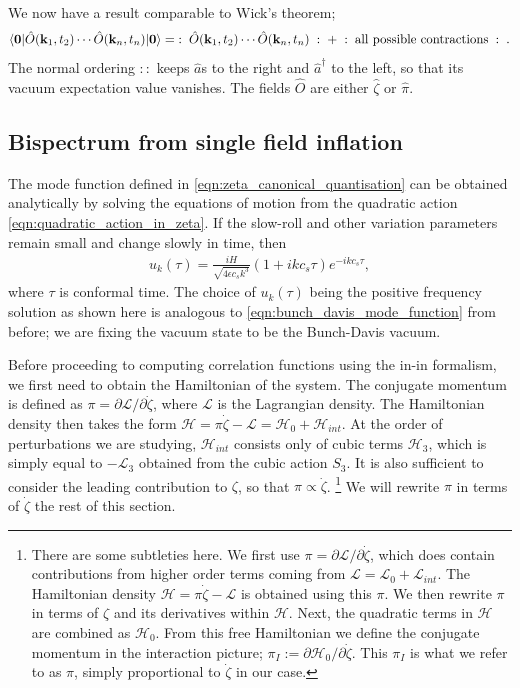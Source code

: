 We now have a result comparable to Wick's theorem;
\begin{align}
	\langle\mathbf{0}| \hat{O}(\mathbf{k}_1,t_2) \cdots \hat{O}(\mathbf{k}_n,t_n) |\mathbf{0}\rangle = \;:\; \hat{O}(\mathbf{k}_1,t_2)  \cdots \hat{O}(\mathbf{k}_n,t_n) \;:\; + \;:\;\text{all possible contractions}\;:\;. \label{eqn:in_in_Wicks_theorem}
\end{align}
The normal ordering $::$ keeps $\hat{a}$s to the right and $\hat{a}^\dagger$ to the left, so that its vacuum expectation value vanishes. The fields $\hat{O}$ are either $\hat{\zeta}$ or $\hat{\pi}$. 

\subsection{Bispectrum from single field inflation} \label{section:bispectrum_from_single_field_inflation}

The mode function defined in \eqref{eqn:zeta_canonical_quantisation} can be obtained analytically by solving the equations of motion from the quadratic action \eqref{eqn:quadratic_action_in_zeta}. If the slow-roll and other variation parameters remain small and change slowly in time, then
\begin{align}
	u_k(\tau) = \frac{iH}{\sqrt{4\epsilon c_s k^3}} (1 + ikc_s \tau) e^{-ikc_s \tau},
\end{align}
where $\tau$ is conformal time. The choice of $u_k(\tau)$ being the positive frequency solution as shown here is analogous to \eqref{eqn:bunch_davis_mode_function} from before; we are fixing the vacuum state to be the Bunch-Davis vacuum.

Before proceeding to computing correlation functions using the in-in formalism, we first need to obtain the Hamiltonian of the system. The conjugate momentum is defined as $\pi = \partial \mathcal{L} / \partial \dot{\zeta}$, where $\mathcal{L}$ is the Lagrangian density. The Hamiltonian density then takes the form $\mathcal{H} = \pi \dot{\zeta} - \mathcal{L} = \mathcal{H}_0 + \mathcal{H}_{int}$. At the order of perturbations we are studying, $\mathcal{H}_{int}$ consists only of cubic terms $\mathcal{H}_3$, which is simply equal to $-\mathcal{L}_3$ obtained from the cubic action $S_3$. It is also sufficient to consider the leading contribution to $\zeta$, so that $\pi \propto \dot{\zeta}$.
\footnote{There are some subtleties here. We first use $\pi = \partial \mathcal{L} / \partial \dot{\zeta}$, which does contain contributions from higher order terms coming from $\mathcal{L}=\mathcal{L}_0 + \mathcal{L}_{int}$. The Hamiltonian density $\mathcal{H} = \pi \dot{\zeta} - \mathcal{L}$ is obtained using this $\pi$. We then rewrite $\pi$ in terms of $\zeta$ and its derivatives within $\mathcal{H}$. Next, the quadratic terms in $\mathcal{H}$ are combined as $\mathcal{H}_0$. From this free Hamiltonian we define the conjugate momentum in the interaction picture; $\pi_I :=  \partial \mathcal{H}_0 / \partial \dot{\zeta}$. This $\pi_I$ is what we refer to as $\pi$, simply proportional to $\dot{\zeta}$ in our case.}
We will rewrite $\pi$ in terms of $\dot{\zeta}$ the rest of this section.

